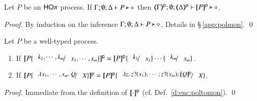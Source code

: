 
\begin{proposition}\label{prop:typepresp}
Let $P$ be an  $\mathsf{HO}\pi$ process.
If			$\Gamma; \emptyset; \Delta \vdash P \triangleright \diamond$ then 
			$\mapt{\Gamma}^{\mathsf{p}}; \emptyset; \mapt{\Delta}^{\mathsf{p}} \proves \map{P}^{\mathsf{p}} \hastype \Proc$. 
\end{proposition}

\begin{proof}
By induction on the inference $\Gamma; \emptyset; \Delta \vdash P \triangleright \diamond$.
Details in \S\,\ref{app:polmon}.
	\qed
\end{proof}

\begin{proposition}\label{p:poltomo}
Let $P$ be a well-typed process.
\begin{enumerate}[$-$]
\item If $\map{P\subst{k_1,\cdots, k_m}{x_1, \cdots, x_m}}^{\mathsf{p}} = \map{P}^{\mathsf{p}}\subst{k_1}{x_1}\cdots\subst{k_m}{x_m}$.


\item If $\map{P\subst{\abs{x_1, \cdots, x_m} Q}{X}}^{\mathsf{p}} = \map{P}^{\mathsf{p}}\subst{\abs{z}\binp{z}{x_1} \cdots ; \binp{z}{x_m} \map{Q}^{\mathsf{p}}}{X}$.

\end{enumerate}
\end{proposition}
\begin{proof}
Immediate from the definition of $[\!\![\cdot]\!\!]^{\mathsf{p}}$ (cf. Def.~\ref{d:enc:poltomon}).
	\qed
\end{proof}


